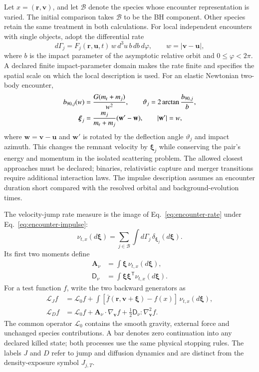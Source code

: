 \documentclass[aps,prd,reprint,amsmath,amssymb,superscriptaddress,nofootinbib,longbibliography,floatfix]{revtex4-2}
\begin{document}
Let $x=(\mathbf r,\mathbf v)$, and let $\mathcal B$ denote the species whose encounter representation is varied. The initial comparison takes $\mathcal B$ to be the BH component. Other species retain the same treatment in both calculations. For local independent encounters with single objects, adopt the differential rate
\begin{equation}
d\Gamma_j=F_j(\mathbf r,\mathbf u,t)\,w\,d^3u\,b\,db\,d\varphi,
\qquad w=|\mathbf v-\mathbf u|,
\label{eq:encounter-rate}
\end{equation}
where $b$ is the impact parameter of the asymptotic relative orbit and $0\leq\varphi<2\pi$. A declared finite impact-parameter domain makes the rate finite and specifies the spatial scale on which the local description is used. For an elastic Newtonian two-body encounter,
\begin{align}
b_{90,j}(w)&=\frac{G(m_{\rm r}+m_j)}{w^2},\qquad
\vartheta_j=2\arctan\frac{b_{90,j}}{b},\nonumber\\
\boldsymbol\xi_j&=\frac{m_j}{m_{\rm r}+m_j}
(\mathbf w'-\mathbf w),\qquad |\mathbf w'|=w,
\label{eq:encounter-impulse}
\end{align}
where $\mathbf w=\mathbf v-\mathbf u$ and $\mathbf w'$ is rotated by the deflection angle $\vartheta_j$ and impact azimuth. This changes the remnant velocity by $\boldsymbol\xi_j$ while conserving the pair's energy and momentum in the isolated scattering problem. The allowed closest approaches must be declared; binaries, relativistic capture and merger transitions require additional interaction laws. The impulse description assumes an encounter duration short compared with the resolved orbital and background-evolution times.

The velocity-jump rate measure is the image of Eq.~\eqref{eq:encounter-rate} under Eq.~\eqref{eq:encounter-impulse}:
\begin{equation}
\nu_{t,x}(d\boldsymbol\xi)
=\sum_{j\in\mathcal B}\int d\Gamma_j\,
\delta_{\boldsymbol\xi_j}(d\boldsymbol\xi).
\label{eq:jump-measure}
\end{equation}
Its first two moments define
\begin{align}
\mathbf A_\nu&=\int\boldsymbol\xi\,\nu_{t,x}(d\boldsymbol\xi),\nonumber\\
\mathsf D_\nu&=\int\boldsymbol\xi\boldsymbol\xi^{\mathsf T}
\nu_{t,x}(d\boldsymbol\xi).
\label{eq:matched-moments}
\end{align}
For a test function $f$, write the two backward generators as
\begin{align}
\mathcal L_J f&=\mathcal L_0 f+
\int[\bar f(\mathbf r,\mathbf v+\boldsymbol\xi)-f(x)]\,
\nu_{t,x}(d\boldsymbol\xi),\nonumber\\
\mathcal L_D f&=\mathcal L_0 f+
\mathbf A_\nu\cdot\nabla_{\mathbf v}f
+\tfrac12\mathsf D_\nu:\nabla_{\mathbf v}^2f.
\label{eq:matched-generators}
\end{align}
The common operator $\mathcal L_0$ contains the smooth gravity, external force and unchanged species contributions. A bar denotes zero continuation into any declared killed state; both processes use the same physical stopping rules. The labels $J$ and $D$ refer to jump and diffusion dynamics and are distinct from the density-exposure symbol $J_{j,T}$.
\end{document}
